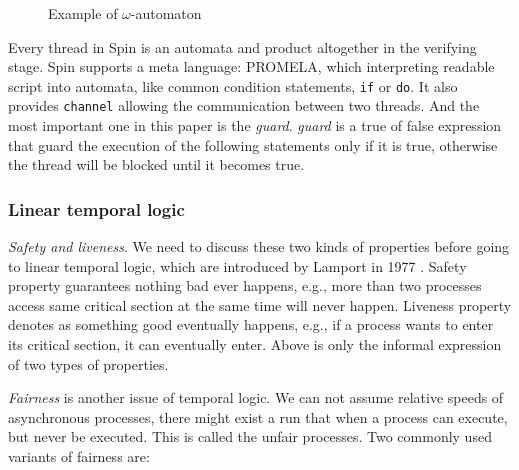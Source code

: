 \begin{figure}
\quad
{}
\caption{Example of $\omega$-automaton}
\end{figure}

Every thread in Spin is an automata and product altogether in the verifying stage. Spin supports a meta language: PROMELA, which interpreting readable script into automata, like common condition statements, \texttt{if} or \texttt{do}. It also provides \texttt{channel} allowing the communication between two threads. And the most important one in this paper is the \textit{guard}. \textit{guard} is a true of false expression that guard the execution of the following statements only if it is true, otherwise the thread will be blocked until it becomes true.

\subsubsection{Linear temporal logic}
\textit{Safety and liveness}. We need to discuss these two kinds of properties before going to linear temporal logic, which are introduced by Lamport in 1977 \cite{Lamport:1977:PCM:1313313.1313439}. Safety property guarantees nothing bad ever happens, e.g., more than two processes access same critical section at the same time will never happen. Liveness property denotes as something good eventually happens, e.g., if a process wants to enter its critical section, it can eventually enter. Above is only the informal expression of two types of properties.

\textit{Fairness} is another issue of temporal logic. We can not assume relative speeds of asynchronous processes, there might exist a run that when a process can execute, but never be executed. This is called the unfair processes. Two commonly used variants of fairness are:

